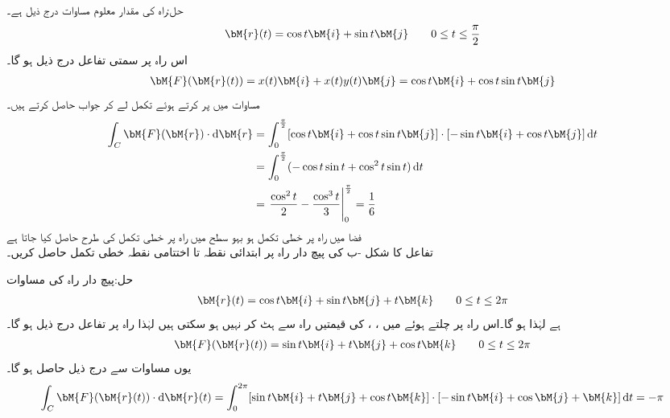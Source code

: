 حل:راہ  کی مقدار معلوم مساوات درج ذیل ہے۔
\begin{align*}
\bM{r}(t)=\cos t\bM{i}+\sin t\bM{j}\quad \quad 0\le t \le \frac{\pi}{2}
\end{align*} 
اس راہ پر سمتی تفاعل درج ذیل ہو گا۔
\begin{align*}
\bM{F}(\bM{r}(t))=x(t)\bM{i}+x(t)y(t)\bM{j}=\cos t \bM{i}+\cos t \sin t \bM{j}
\end{align*}
مساوات  میں  پر کرتے ہوئے تکمل لے کر جواب حاصل کرتے ہیں۔
\begin{align*}
\int_C \bM{F}(\bM{r})\cdot \dif \bM{r}&=\int_0^{\frac{\pi}{2}}[\cos t \bM{i}+\cos t \sin t \bM{j}]\cdot [-\sin t\bM{i}+\cos t\bM{j}] \dif t\\
&=\int_0^{\frac{\pi}{2}}(-\cos t\sin t+\cos^2 t\sin t)\dif t\\
&=\left. \frac{\cos^2 t}{2}-\frac{\cos^3 t}{3}\right|_0^{\frac{\pi}{2}}=\frac{1}{6}
\end{align*}
\quad فضا میں راہ پر خطی تکمل ہو بہو سطح میں راہ پر خطی تکمل کی طرح حاصل کیا جاتا ہے\\
تفاعل  کا شکل -ب کی پیچ دار راہ پر  ابتدائی نقطہ تا  اختتامی نقطہ  خطی تکمل حاصل کریں۔

حل:پیچ دار راہ کی مساوات 
\begin{align*}
\bM{r}(t)=\cos t\bM{i}+\sin t\bM{j}+t\bM{k}\quad \quad 0\le t \le 2\pi
\end{align*}
ہے لہٰذا  ہو گا۔اس راہ پر چلتے ہوئے  میں ، ،  کی قیمتیں راہ سے ہٹ کر نہیں ہو سکتی ہیں لہٰذا راہ پر تفاعل درج ذیل ہو گا۔
\begin{align*}
\bM{F}(\bM{r}(t))=\sin t \bM{i}+t\bM{j}+\cos t\bM{k} \quad \quad 0\le t \le 2\pi
\end{align*}
یوں مساوات  سے درج ذیل حاصل ہو گا۔
\begin{align*}
\int_C\bM{F}(\bM{r}(t))\cdot \dif \bM{r}(t)=\int_0^{2\pi} [\sin t \bM{i}+t\bM{j}+\cos t\bM{k}] \cdot [-\sin t\bM{i}+\cos \bM{j}+\bM{k}]\dif t=-\pi
\end{align*}

